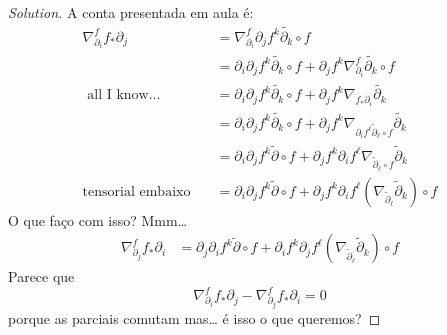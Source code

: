 \begin{proof}[Solution]
A conta presentada em aula é:
\begin{align*}
\nabla_{\partial_i}^f f_* \partial_j&=\nabla_{\partial_i}^f\partial_jf^k\tilde{\partial_k}\circ f\\
&=\partial_i\partial_j f^k\tilde{\partial_k}\circ f+\partial_jf^k\nabla^f_{\partial_i}\tilde{\partial_k}\circ f\\
\text{ all I know…}\quad  &=\partial_i\partial_j f^k\tilde{\partial_k}\circ f+\partial_jf^k\nabla_{f_*\partial_i}\tilde{\partial_k} \\
&=\partial_i\partial_j f^k\tilde{\partial_k}\circ f+\partial_jf^k\nabla_{\partial_if^\ell\tilde{\partial}_\ell \circ f}\tilde{\partial_k}\\
&=\partial_i\partial_j f^k\tilde{\partial}\circ f+\partial_j f^k \partial_i f^\ell\nabla_{\tilde{\partial}_\ell \circ f}\tilde{\partial}_k\\
\text{tensorial embaixo}\quad &=\partial_i\partial_j f^k\tilde{\partial}\circ f+\partial_j f^k \partial_i f^\ell\left(\nabla_{\tilde{\partial}_\ell}\tilde{\partial}_k\right)\circ f
\end{align*}
O que faço com isso? Mmm…
\begin{align*}
\nabla_{\partial_j}^f f_* \partial_i&=\partial_j\partial_i f^k\tilde{\partial}\circ f+\partial_i f^k \partial_j f^\ell\left(\nabla_{\tilde{\partial}_\ell}\tilde{\partial}_k\right)\circ f
\end{align*}
Parece que
\[\nabla_{\partial_i}^f f_* \partial_j-\nabla_{\partial_j}^f f_* \partial_i=0\]
porque as parciais comutam mas… é isso o que queremos?
\end{proof}

